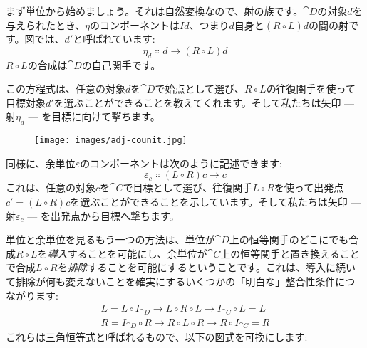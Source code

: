 \noindent
まず単位から始めましょう。それは自然変換なので、射の族です。$\cat{D}$の対象$d$を与えられたとき、$\eta$のコンポーネントは$I d$、つまり$d$自身と$(R \circ L) d$の間の射です。図では、$d'$と呼ばれています: 
\[\eta_d \Colon d \to (R \circ L) d\]
$R \circ L$の合成は$\cat{D}$の自己関手です。

この方程式は、任意の対象$d$を$\cat{D}$で始点として選び、$R \circ L$の往復関手を使って目標対象$d'$を選ぶことができることを教えてくれます。そして私たちは矢印 --- 射$\eta_d$ --- を目標に向けて撃ちます。

\begin{figure}[H]
  \centering
  \texttt{[image: images/adj-counit.jpg]}
\end{figure}

\noindent
同様に、余単位$\varepsilon$のコンポーネントは次のように記述できます: 
\[\varepsilon_{c} \Colon (L \circ R) c \to c\]
これは、任意の対象$c$を$\cat{C}$で目標として選び、往復関手$L \circ R$を使って出発点$c' = (L \circ R) c$を選ぶことができることを示しています。そして私たちは矢印 --- 射$\varepsilon_{c}$ --- を出発点から目標へ撃ちます。

単位と余単位を見るもう一つの方法は、単位が$\cat{D}$上の恒等関手のどこにでも合成$R \circ L$を\emph{導入}することを可能にし、余単位が$\cat{C}$上の恒等関手と置き換えることで合成$L \circ R$を\emph{排除}することを可能にするということです。これは、導入に続いて排除が何も変えないことを確実にするいくつかの「明白な」整合性条件につながります: 
\begin{gather*}
  L = L \circ I_{\cat{D}} \to L \circ R \circ L \to I_{\cat{C}} \circ L = L \\
  R = I_{\cat{D}} \circ R \to R \circ L \circ R \to R \circ I_{\cat{C}} = R
\end{gather*}
これらは三角恒等式と呼ばれるもので、以下の図式を可換にします: 

\begin{figure}[H]
  \centering

  \begin{subfigure}
    \centering
  \end{subfigure}%
  \hspace{1cm}
  \begin{subfigure}
    \centering
  \end{subfigure}
\end{figure}

